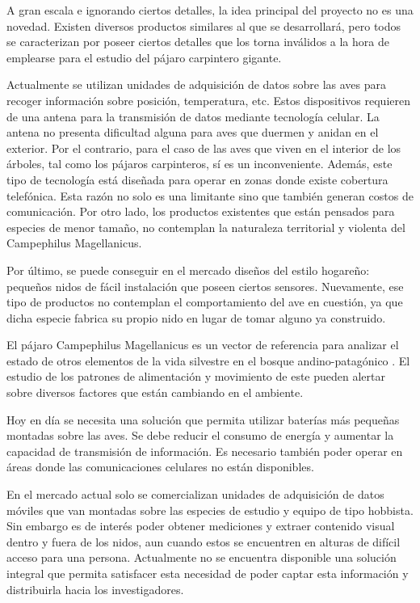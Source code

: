 %

%


A gran escala e ignorando ciertos detalles, la idea principal del proyecto no es una novedad. Existen diversos productos similares al que se desarrollará, pero todos se caracterizan por poseer ciertos detalles que los torna inválidos a la hora de emplearse para el estudio del pájaro carpintero gigante.

Actualmente se utilizan unidades de adquisición de datos sobre las aves para recoger información sobre posición, temperatura, etc. Estos dispositivos requieren de una antena para la transmisión de datos mediante tecnología celular. La antena no presenta dificultad alguna para aves que duermen y anidan en el exterior. Por el contrario, para el caso de las aves que viven en el interior de los árboles, tal como los pájaros carpinteros, sí es un inconveniente. Además, este tipo de tecnología está diseñada para operar en zonas donde existe cobertura telefónica. Esta razón no solo es una limitante sino que también generan costos de comunicación. Por otro lado, los productos existentes que están pensados para especies de menor tamaño, no contemplan la naturaleza territorial y violenta del Campephilus Magellanicus.

Por último, se puede conseguir en el mercado diseños del estilo hogareño: pequeños nidos de fácil instalación que poseen ciertos sensores. Nuevamente, ese tipo de productos no contemplan el comportamiento del ave en cuestión, ya que dicha especie fabrica su propio nido en lugar de tomar alguno ya construido.


El pájaro Campephilus Magellanicus es un vector de referencia para analizar el estado de otros elementos de la vida silvestre en el bosque andino-patagónico \cite{ref:PaperValeriaOjeda}. El estudio de los patrones de alimentación y movimiento de este pueden alertar sobre diversos factores que están cambiando en el ambiente.

Hoy en día se necesita una solución que permita utilizar baterías más pequeñas montadas sobre las aves. Se debe reducir el consumo de energía y aumentar la capacidad de transmisión de información. Es necesario también poder operar en áreas donde las comunicaciones celulares no están disponibles.

En el mercado actual solo se comercializan unidades de adquisición de datos móviles que van montadas sobre las especies de estudio y equipo de tipo hobbista. Sin embargo es de interés poder obtener mediciones y extraer contenido visual dentro y fuera de los nidos, aun cuando estos se encuentren en alturas de difícil acceso para una persona. Actualmente no se encuentra disponible una solución integral que permita satisfacer esta necesidad de poder captar esta información y distribuirla hacia los investigadores.

%
